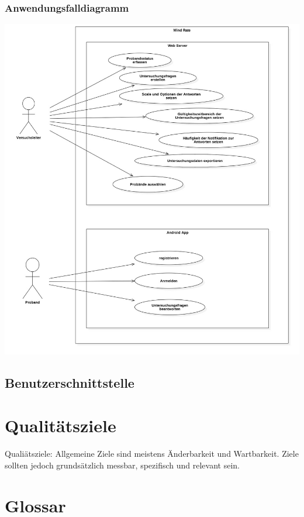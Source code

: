 \documentclass[a4paper]{scrreprt}
\begin{document}
            \subsection{Anwendungsfalldiagramm} 
                \vspace{0.2cm}
                \begin{center}
                    \includegraphics[scale = 0.4]{UseCaseDiagram1.jpg}
                \end{center}

        \newpage
        \section{Benutzerschnittstelle}
 
    \chapter{Qualitätsziele}
        Qualiätsziele: Allgemeine Ziele sind meistens Änderbarkeit und Wartbarkeit.
        Ziele sollten jedoch grundsätzlich messbar, spezifisch und relevant sein.
 
    \chapter{Glossar}
 
    \listoffigures
 
\end{document}
